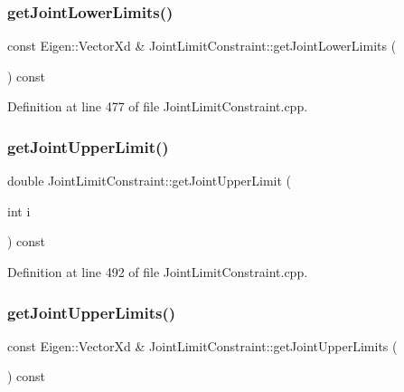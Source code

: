 \subsubsection{\texorpdfstring{get\+Joint\+Lower\+Limits()}{getJointLowerLimits()}}
{\footnotesize\ttfamily const Eigen\+::\+Vector\+Xd \& Joint\+Limit\+Constraint\+::get\+Joint\+Lower\+Limits (\begin{DoxyParamCaption}{ }\end{DoxyParamCaption}) const}



Definition at line 477 of file Joint\+Limit\+Constraint.\+cpp.

\hypertarget{classocra_1_1JointLimitConstraint_af08f9fe570f139055dc609e34d44e062}{}\label{classocra_1_1JointLimitConstraint_af08f9fe570f139055dc609e34d44e062} 
\subsubsection{\texorpdfstring{get\+Joint\+Upper\+Limit()}{getJointUpperLimit()}}
{\footnotesize\ttfamily double Joint\+Limit\+Constraint\+::get\+Joint\+Upper\+Limit (\begin{DoxyParamCaption}\item[{int}]{i }\end{DoxyParamCaption}) const}



Definition at line 492 of file Joint\+Limit\+Constraint.\+cpp.

\hypertarget{classocra_1_1JointLimitConstraint_a5055bb2f327a4fef0b43a3e92309e16f}{}\label{classocra_1_1JointLimitConstraint_a5055bb2f327a4fef0b43a3e92309e16f} 
\subsubsection{\texorpdfstring{get\+Joint\+Upper\+Limits()}{getJointUpperLimits()}}
{\footnotesize\ttfamily const Eigen\+::\+Vector\+Xd \& Joint\+Limit\+Constraint\+::get\+Joint\+Upper\+Limits (\begin{DoxyParamCaption}{ }\end{DoxyParamCaption}) const}



